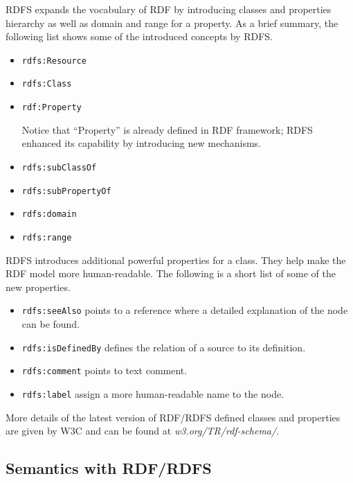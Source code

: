 RDFS expands the vocabulary of RDF by introducing classes and properties hierarchy as well as domain and range for a property. As a brief summary, the following list shows some of the introduced concepts by RDFS.
\begin{itemize}
	\item \verb|rdfs:Resource|
	\item \verb|rdfs:Class|
	\item \verb|rdf:Property| 
	
	Notice that ``Property'' is already defined in RDF framework; RDFS enhanced its capability by introducing new mechanisms.
	
	\item \verb|rdfs:subClassOf|
	\item \verb|rdfs:subPropertyOf|
	\item \verb|rdfs:domain|
	\item \verb|rdfs:range|
\end{itemize}

RDFS introduces additional powerful properties for a class. They help make the RDF model more human-readable. The following is a short list of some of the new properties.
\begin{itemize}
	\item \verb|rdfs:seeAlso| points to a reference where a detailed explanation of the node can be found.
	\item \verb|rdfs:isDefinedBy| defines the relation of a source to its definition.
	\item \verb|rdfs:comment| points to text comment.
	\item \verb|rdfs:label| assign a more human-readable name to the node.
\end{itemize}

More details of the latest version of RDF/RDFS defined classes and properties are given by W3C and can be found at \textit{w3.org/TR/rdf-schema/}.

\subsection{Semantics with RDF/RDFS}

